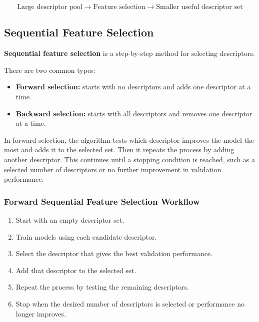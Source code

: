 \documentclass[11pt]{report}
\newenvironment{Important note}{\begin{quote}\color{red}\textbf{Important note:} }{\end{quote}}
\begin{document}
\begin{center}
\[
\text{Large descriptor pool} \rightarrow \text{Feature selection} \rightarrow \text{Smaller useful descriptor set}
\]
\end{center}

\subsection{Sequential Feature Selection}

\textbf{Sequential feature selection} is a step-by-step method for selecting descriptors.

There are two common types:

\begin{itemize}[leftmargin=*]
    \item \textbf{Forward selection:} starts with no descriptors and adds one descriptor at a time.
    \item \textbf{Backward selection:} starts with all descriptors and removes one descriptor at a time.
\end{itemize}

In forward selection, the algorithm tests which descriptor improves the model the most and adds it to the selected set. Then it repeats the process by adding another descriptor. This continues until a stopping condition is reached, such as a selected number of descriptors or no further improvement in validation performance.

\subsubsection*{Forward Sequential Feature Selection Workflow}

\begin{enumerate}[leftmargin=*]
    \item Start with an empty descriptor set.
    \item Train models using each candidate descriptor.
    \item Select the descriptor that gives the best validation performance.
    \item Add that descriptor to the selected set.
    \item Repeat the process by testing the remaining descriptors.
    \item Stop when the desired number of descriptors is selected or performance no longer improves.
\end{enumerate}
\end{document}
